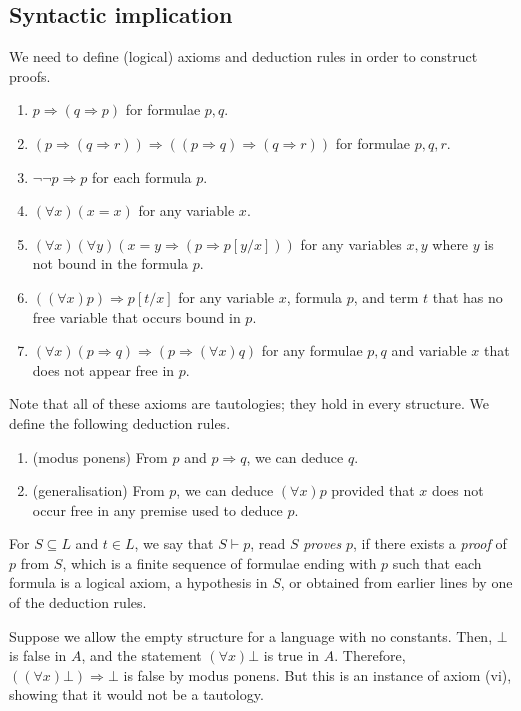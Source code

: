 \subsection{Syntactic implication}
We need to define (logical) axioms and deduction rules in order to construct proofs.
\begin{enumerate}
    \item \( p \Rightarrow (q \Rightarrow p) \) for formulae \( p, q \).
    \item \( (p \Rightarrow (q \Rightarrow r)) \Rightarrow ((p \Rightarrow q) \Rightarrow (q \Rightarrow r)) \) for formulae \( p, q, r \).
    \item \( \neg\neg p \Rightarrow p \) for each formula \( p \).
    \item \( (\forall x)(x = x) \) for any variable \( x \).
    \item \( (\forall x)(\forall y)(x = y \Rightarrow (p \Rightarrow p[y/x])) \) for any variables \( x, y \) where \( y \) is not bound in the formula \( p \).
    \item \( ((\forall x)p) \Rightarrow p[t/x] \) for any variable \( x \), formula \( p \), and term \( t \) that has no free variable that occurs bound in \( p \).
    \item \( (\forall x)(p \Rightarrow q) \Rightarrow (p \Rightarrow (\forall x)q) \) for any formulae \( p, q \) and variable \( x \) that does not appear free in \( p \).
\end{enumerate}
Note that all of these axioms are tautologies; they hold in every structure.
We define the following deduction rules.
\begin{enumerate}
    \item (modus ponens) From \( p \) and \( p \Rightarrow q \), we can deduce \( q \).
    \item (generalisation) From \( p \), we can deduce \( (\forall x)p \) provided that \( x \) does not occur free in any premise used to deduce \( p \).
\end{enumerate}
For \( S \subseteq L \) and \( t \in L \), we say that \( S \vdash p \), read \( S \) \emph{proves} \( p \), if there exists a \emph{proof} of \( p \) from \( S \), which is a finite sequence of formulae ending with \( p \) such that each formula is a logical axiom, a hypothesis in \( S \), or obtained from earlier lines by one of the deduction rules.
\begin{remark}
    Suppose we allow the empty structure for a language with no constants.
    Then, \( \bot \) is false in \( A \), and the statement \( (\forall x)\bot \) is true in \( A \).
    Therefore, \( ((\forall x)\bot) \Rightarrow \bot \) is false by modus ponens.
    But this is an instance of axiom (vi), showing that it would not be a tautology.
\end{remark}
